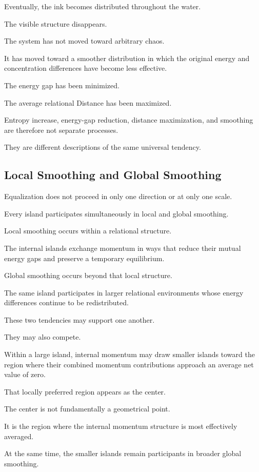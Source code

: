 Eventually, the ink becomes distributed throughout the water.

The visible structure disappears.

The system has not moved toward arbitrary chaos.

It has moved toward a smoother distribution in which the original energy and concentration differences have become less effective.

The energy gap has been minimized.

The average relational Distance has been maximized.

Entropy increase, energy-gap reduction, distance maximization, and smoothing are therefore not separate processes.

They are different descriptions of the same universal tendency.

\subsection*{\textbf{Local Smoothing and Global Smoothing}}

Equalization does not proceed in only one direction or at only one scale.

Every island participates simultaneously in local and global smoothing.

Local smoothing occurs within a relational structure.

The internal islands exchange momentum in ways that reduce their mutual energy gaps and preserve a temporary equilibrium.

Global smoothing occurs beyond that local structure.

The same island participates in larger relational environments whose energy differences continue to be redistributed.

These two tendencies may support one another.

They may also compete.

Within a large island, internal momentum may draw smaller islands toward the region where their combined momentum contributions approach an average net value of zero.

That locally preferred region appears as the center.

The center is not fundamentally a geometrical point.

It is the region where the internal momentum structure is most effectively averaged.

At the same time, the smaller islands remain participants in broader global smoothing.

